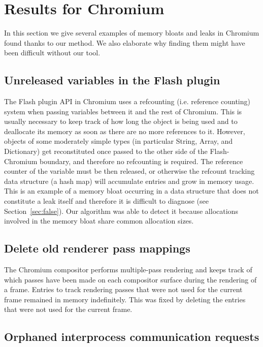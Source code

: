 \documentclass[preprint, numbers]{sigplanconf}
\newcommand{\todo}[1]{{\color{red}{(TODO: #1)}}}
\begin{document}
\section{Results for Chromium}
\label{sec:results}

In this section we give several examples of memory bloats and leaks in Chromium found
thanks to our method.
We also elaborate why finding them might have been difficult without our tool.

\subsection{Unreleased variables in the Flash plugin \cite{cr-flash}}

The Flash plugin API in Chromium uses a refcounting (i.e. reference counting) system when passing variables between it and the rest of Chromium.
This is usually necessary to keep track of how long the object is being used and
to deallocate its memory as soon as there are no more references to it.
However, objects of some moderately simple types (in particular String, Array, and Dictionary)
get reconstituted once passed to the other side of the Flash-Chromium boundary, and therefore no refcounting is required.
The reference counter of the variable must be then released, or otherwise the refcount tracking data
structure (a hash map) will accumulate entries and grow in memory usage.
This is an example of a memory bloat occurring in a data structure
that does not constitute a leak itself and therefore it is difficult to diagnose (see Section~\ref{sec:false}).
Our algorithm was able to detect it because allocations involved in the memory bloat share common allocation sizes.

\subsection{Delete old renderer pass mappings \cite{cr-mappings}}

\todo{Rewrite} The Chromium compositor performs multiple-pass rendering and keeps track of which passes have been
made on each compositor surface during the rendering of a frame.
Entries to track rendering passes that were not used for the current frame
remained in memory indefinitely.
This was fixed by deleting the entries that were not used for the current frame.

\subsection{Orphaned interprocess communication requests \cite{cr-orphaned}}
\end{document}
